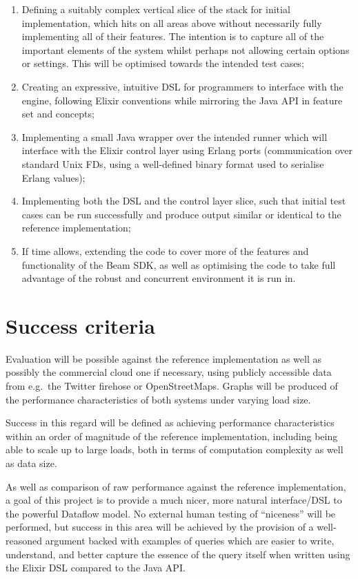 \documentclass[11pt]{scrartcl}
\begin{document}
\begin{enumerate}
	\item Defining a suitably complex vertical slice of the stack for initial implementation, which hits on all areas above without necessarily fully implementing all of their features. The intention is to capture all of the important elements of the system whilst perhaps not allowing certain options or settings. This will be optimised towards the intended test cases;
	\item Creating an expressive, intuitive DSL for programmers to interface with the engine, following Elixir conventions while mirroring the Java API in feature set and concepts;
	\item Implementing a small Java wrapper over the intended runner which will interface with the Elixir control layer using Erlang ports (communication over standard Unix FDs, using a well-defined binary format used to serialise Erlang values);
	\item Implementing both the DSL and the control layer slice, such that initial test cases can be run successfully and produce output similar or identical to the reference implementation;
	\item If time allows, extending the code to cover more of the features and functionality of the Beam SDK, as well as optimising the code to take full advantage of the robust and concurrent environment it is run in.
\end{enumerate}

\section*{Success criteria}

Evaluation will be possible against the reference implementation as well as possibly the commercial cloud one if necessary, using publicly accessible data from e.g.\ the Twitter firehose or OpenStreetMaps. Graphs will be produced of the performance characteristics of both systems under varying load size.

Success in this regard will be defined as achieving performance characteristics within an order of magnitude of the reference implementation, including being able to scale up to large loads, both in terms of computation complexity as well as data size.

As well as comparison of raw performance against the reference implementation, a goal of this project is to provide a much nicer, more natural interface/DSL to the powerful Dataflow model. No external human testing of ``niceness'' will be performed, but success in this area will be achieved by the provision of a well-reasoned argument backed with examples of queries which are easier to write, understand, and better capture the essence of the query itself when written using the Elixir DSL compared to the Java API.
\end{document}

